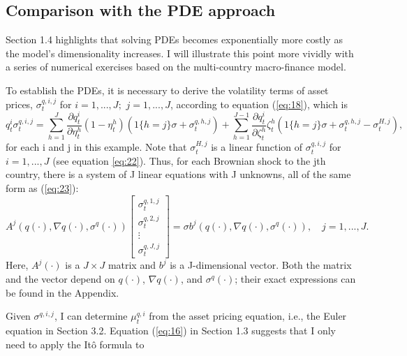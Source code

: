 \documentclass{article}
\begin{document}
\subsection{Comparison with the PDE approach}

Section 1.4 highlights that solving PDEs becomes exponentially more costly as the model's dimensionality increases. I will illustrate this point more vividly with a series of numerical exercises based on the multi-country macro-finance model.

To establish the PDEs, it is necessary to derive the volatility terms of asset prices, $\sigma_{t}^{q,i,j}$ for $i=1,...,J;$ $j=1,...,J$, according to equation (\ref{eq:18}), which is
\begin{equation}
q_{t}^{i}\sigma_{t}^{q,i,j}=\sum_{h=1}^{J}\frac{\partial q_{t}^{i}}{\partial\eta_{t}^{h}}(1-\eta_{t}^{h})(1\{h=j\}\sigma+\sigma_{t}^{q,h,j})+\sum_{h=1}^{J-1}\frac{\partial q_{t}^{i}}{\partial\zeta_{t}^{h}}\zeta_{t}^{h}(1\{h=j\}\sigma+\sigma_{t}^{q,h,j}-\sigma_{t}^{H,j}),
\label{eq:23}
\end{equation}
for each i and j in this example. Note that $\sigma_{t}^{H,j}$ is a linear function of $\sigma_{t}^{q,i,j}$ for $i=1,...,J$ (see equation \ref{eq:22}). Thus, for each Brownian shock to the jth country, there is a system of J linear equations with J unknowns, all of the same form as (\ref{eq:23}):
\begin{equation}
A^{j}(q(\cdot),\nabla q(\cdot),\sigma^{q}(\cdot))\begin{bmatrix}\sigma_{t}^{q,1,j}\\ \sigma_{t}^{q,2,j}\\ \vdots\\ \sigma_{t}^{q,J,j}\end{bmatrix}=\sigma b^{j}(q(\cdot),\nabla q(\cdot),\sigma^{q}(\cdot)), \quad j=1,...,J.
\label{eq:24}
\end{equation}
Here, $A^{j}(\cdot)$ is a $J\times J$ matrix and $b^{j}$ is a J-dimensional vector. Both the matrix and the vector depend on $q(\cdot)$, $\nabla q(\cdot)$, and $\sigma^{q}(\cdot)$; their exact expressions can be found in the Appendix.

Given $\sigma^{q,i,j}$, I can determine $\mu_{t}^{q,i}$ from the asset pricing equation, i.e., the Euler equation in Section 3.2. Equation (\ref{eq:16}) in Section 1.3 suggests that I only need to apply the Itô formula to

\clearpage
\end{document}
